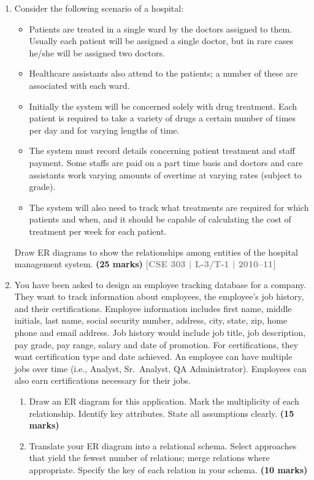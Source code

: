 \documentclass[12pt,a3paper]{article}
\newcommand{\yr}[1]{\hfill\textcolor{gray}{\small\textbf{[#1]}}}
\newcommand{\mk}[1]{\textcolor{orange!70!black}{\small\textbf{(#1 marks)}}}
\begin{document}
\begin{enumerate}

\item Consider the following scenario of a hospital:

\begin{itemize}[leftmargin=1.5em,itemsep=2pt]
  \item Patients are treated in a single ward by the doctors assigned to them. Usually each patient will be assigned a single doctor, but in rare cases he/she will be assigned two doctors.
  \item Healthcare assistants also attend to the patients; a number of these are associated with each ward.
  \item Initially the system will be concerned solely with drug treatment. Each patient is required to take a variety of drugs a certain number of times per day and for varying lengths of time.
  \item The system must record details concerning patient treatment and staff payment. Some staffs are paid on a part time basis and doctors and care assistants work varying amounts of overtime at varying rates (subject to grade).
  \item The system will also need to track what treatments are required for which patients and when, and it should be capable of calculating the cost of treatment per week for each patient.
\end{itemize}

Draw ER diagrams to show the relationships among entities of the hospital management system.
\mk{25} \yr{CSE 303 | L-3/T-1 | 2010--11}

\item You have been asked to design an employee tracking database for a company. They want to track information about employees, the employee's job history, and their certifications. Employee information includes first name, middle initials, last name, social security number, address, city, state, zip, home phone and email address. Job history would include job title, job description, pay grade, pay range, salary and date of promotion. For certifications, they want certification type and date achieved. An employee can have multiple jobs over time (i.e., Analyst, Sr.\ Analyst, QA Administrator). Employees can also earn certifications necessary for their jobs.
\begin{enumerate}
   
\item Draw an ER diagram for this application. Mark the multiplicity of each relationship. Identify key attributes. State all assumptions clearly.
\mk{15}
\item Translate your ER diagram into a relational schema. Select approaches that yield the fewest number of relations; merge relations where appropriate. Specify the key of each relation in your schema.
\mk{10}
\end{enumerate}


\end{enumerate}
\end{document}
